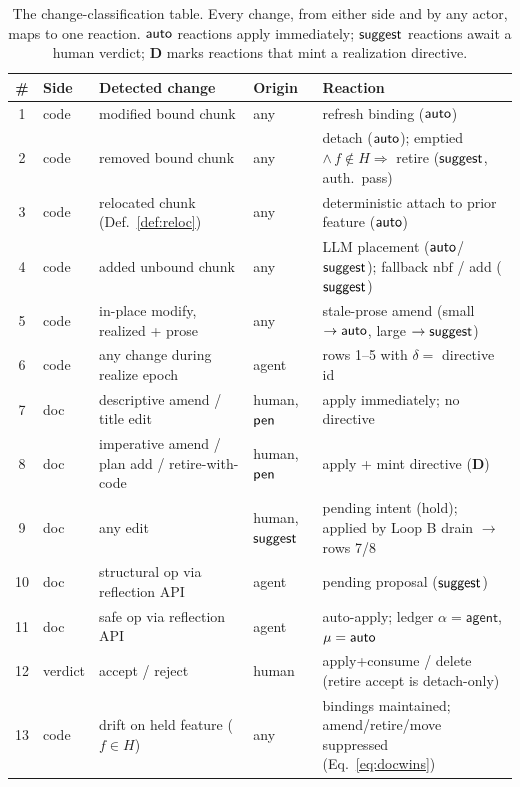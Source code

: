 \begin{table}[t]
\centering
\caption{The change-classification table. Every change, from either side and by
any actor, maps to one reaction. $\textsf{auto}$ reactions apply immediately;
$\textsf{suggest}$ reactions await a human verdict; \textbf{D} marks reactions that
mint a realization directive.}
\label{tab:classify}
\small
\setlength{\tabcolsep}{4.5pt}
\begin{tabular}{@{}cllll@{}}
\toprule
\# & Side & Detected change & Origin & Reaction \\
\midrule
1 & code & modified bound chunk & any & \textsf{refresh} binding ($\textsf{auto}$) \\
2 & code & removed bound chunk & any & \textsf{detach} ($\textsf{auto}$); emptied $\wedge\, f \notin H \Rightarrow$ \textsf{retire} ($\textsf{suggest}$, auth.\ pass) \\
3 & code & relocated chunk (Def.~\ref{def:reloc}) & any & deterministic \textsf{attach} to prior feature ($\textsf{auto}$) \\
4 & code & added unbound chunk & any & LLM placement ($\textsf{auto}$/$\textsf{suggest}$); fallback $\mathrm{nbf}$ / \textsf{add} ($\textsf{suggest}$) \\
5 & code & in-place modify, realized + prose & any & stale-prose \textsf{amend} (small $\to \textsf{auto}$, large $\to \textsf{suggest}$) \\
6 & code & any change during realize epoch & agent & rows 1--5 with $\delta = $ directive id \\
\midrule
7 & doc & descriptive amend / title edit & human, $\textsf{pen}$ & apply immediately; no directive \\
8 & doc & imperative amend / plan add / retire-with-code & human, $\textsf{pen}$ & apply + mint directive (\textbf{D}) \\
9 & doc & any edit & human, $\textsf{suggest}$ & pending intent (hold); applied by Loop B drain $\to$ rows 7/8 \\
10 & doc & structural op via reflection API & agent & pending proposal ($\textsf{suggest}$) \\
11 & doc & safe op via reflection API & agent & auto-apply; ledger $\alpha = \textsf{agent}$, $\mu = \textsf{auto}$ \\
\midrule
12 & verdict & accept / reject & human & apply+consume / delete (\textsf{retire} accept is detach-only) \\
13 & code & drift on held feature ($f \in H$) & any & bindings maintained; \textsf{amend}/\textsf{retire}/\textsf{move} suppressed (Eq.~\ref{eq:docwins}) \\
\bottomrule
\end{tabular}
\end{table}

